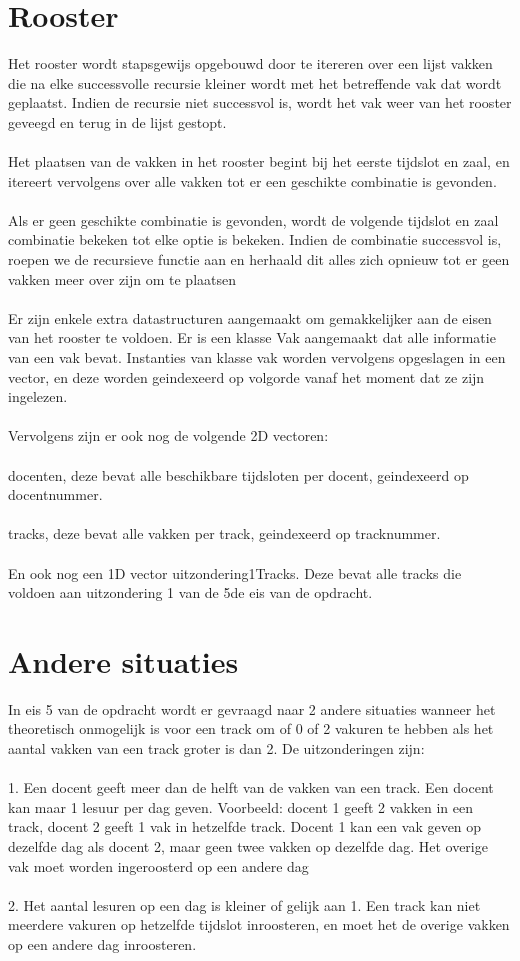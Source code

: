 \documentclass{article}
\begin{document}
\section{Rooster}
Het rooster wordt stapsgewijs opgebouwd door te itereren over een lijst vakken die na elke successvolle recursie kleiner wordt met het betreffende vak dat wordt geplaatst. Indien de recursie niet successvol is, wordt het vak weer van het rooster geveegd en terug in de lijst gestopt.\\ \\
Het plaatsen van de vakken in het rooster begint bij het eerste tijdslot en zaal, en itereert vervolgens over alle vakken tot er een geschikte combinatie is gevonden. \\ \\
Als er geen geschikte combinatie is gevonden, wordt de volgende tijdslot en zaal combinatie bekeken tot elke optie is bekeken. Indien de combinatie successvol is, roepen we de recursieve functie aan en herhaald dit alles zich opnieuw tot er geen vakken meer over zijn om te plaatsen\\ \\
Er zijn enkele extra datastructuren aangemaakt om gemakkelijker aan de eisen van het rooster te voldoen. Er is een klasse Vak aangemaakt dat alle informatie van een vak bevat. Instanties van klasse vak worden vervolgens opgeslagen in een vector, en deze worden geindexeerd op volgorde vanaf het moment dat ze zijn ingelezen. \\ \\
Vervolgens zijn er ook nog de volgende 2D vectoren:\\ \\
docenten, deze bevat alle beschikbare tijdsloten per docent, geindexeerd op docentnummer. \\ \\
tracks, deze bevat alle vakken per track, geindexeerd op tracknummer. \\ \\
En ook nog een 1D vector uitzondering1Tracks. Deze bevat alle tracks die voldoen aan uitzondering 1 van de 5de eis van de opdracht.
\newpage
\section{Andere situaties}
In eis 5 van de opdracht wordt er gevraagd naar 2 andere situaties wanneer het theoretisch onmogelijk is voor een track om of 0 of 2 vakuren te hebben als het aantal vakken van een track groter is dan 2. De uitzonderingen zijn: \\ \\
1. Een docent geeft meer dan de helft van de vakken van een track. Een docent kan maar 1 lesuur per dag geven. Voorbeeld: docent 1 geeft 2 vakken in een track, docent 2 geeft 1 vak in hetzelfde track. Docent 1 kan een vak geven op dezelfde dag als docent 2, maar geen twee vakken op dezelfde dag. Het overige vak moet worden ingeroosterd op een andere dag\\ \\ 
2. Het aantal lesuren op een dag is kleiner of gelijk aan 1.
Een track kan niet meerdere vakuren op hetzelfde tijdslot inroosteren, en moet het de overige vakken op een andere dag inroosteren.
\end{document}
